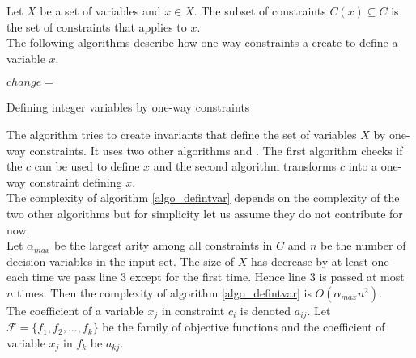 Let $X$ be a set of variables and $x \in X$. The subset of constraints $C(x) \subseteq C$ is the set 
of constraints that applies to $x$.\\ 
The following algorithms describe how one-way constraints a create to define a variable $x$. \\ 



\IncMargin{1em}
\begin{algorithm}[H]

\algdata 
{}
\BlankLine
\Bool $change = $ \true\;
\caption{Defining integer variables by one-way constraints}\label{makefunc}
\end{algorithm}\DecMargin{1em}
\noindent
The algorithm tries to create invariants that define the set of variables $X$ by one-way constraints. It uses two other 
algorithms  and . The first algorithm checks if the \cons $c$ can be used to define 
\var $x$ and the second algorithm transforms $c$ into a one-way constraint defining $x$. \\ 
The complexity of algorithm \ref{algo_defintvar} depends on the complexity of the two other algorithms but for 
simplicity let us assume they do not contribute for now. \\ 
Let $\alpha_{max}$ be the largest arity among all constraints in $C$ and $n$ be the number of decision variables in the 
input set. The size of $X$ has decrease by at least one each time we pass line 3 except for the first time. Hence line 3 
is passed at most $n$ times. Then the complexity of algorithm \ref{algo_defintvar} is $O(\alpha_{max} n^2)$. \\ \medskip
The coefficient of a variable $x_j$ in constraint $c_i$ is denoted $a_{ij}$. Let $\mathcal{F} = \{f_1,f_2,\dots ,f_k\}$ 
be the family of objective functions  and the coefficient of variable $x_j$ 
in $f_k$ be $a_{kj}$.  \\  


